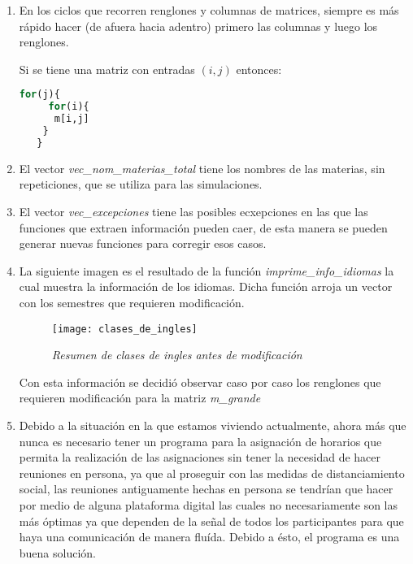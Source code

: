 \begin{appendices}
\begin{enumerate}
  \item En los ciclos que recorren renglones y columnas de matrices, siempre es más rápido hacer (de afuera hacia adentro) primero las columnas y luego los renglones.
  
  Si se tiene una matriz con entradas $(i,j)$ entonces:
  
  \begin{lstlisting}[language=R, caption= \textit{Ejemplo de ciclo for}]
	for(j){
	 for(i){
      m[i,j]
    }
   }
  \end{lstlisting}


  \item El vector \textit{vec\_nom\_materias\_total} tiene los nombres de las materias, sin repeticiones, que se utiliza para las simulaciones.
  
  \item El vector \textit{vec\_excepciones} tiene las posibles ecxepciones en las que las funciones que extraen información pueden caer, de esta manera se pueden generar nuevas funciones para corregir esos casos.
  
  \item La siguiente imagen es el resultado de la función \textit{imprime\_info\_idiomas} la cual muestra la información de los idiomas. Dicha función arroja un vector con los semestres que requieren modificación.

\begin{figure}[H]
\centering
\texttt{[image: clases\_de\_ingles]} %
\caption{\textit{Resumen de clases de ingles antes de modificación}}
\end{figure}
  
Con esta información se decidió observar caso por caso los renglones que requieren modificación para la matriz \textit{m\_grande}


  \item Debido a la situación en la que estamos viviendo actualmente, ahora más que nunca es necesario tener un programa para la asignación de horarios que permita la realización de las asignaciones sin tener la necesidad de hacer reuniones en persona, ya que al proseguir con las medidas de distanciamiento social, las reuniones antiguamente hechas en persona se tendrían que hacer por medio de alguna plataforma digital las cuales no necesariamente son las más óptimas ya que dependen de la señal de todos los participantes para que haya una comunicación de manera fluída. Debido a ésto, el programa es una buena solución.


\end{enumerate}
\end{appendices}
